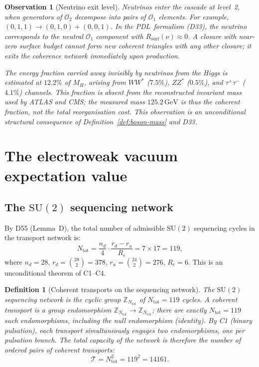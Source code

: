 \documentclass[12pt,a4paper]{article}
\newtheorem{definition}[theorem]{Definition}
\newtheorem{observation}[theorem]{Observation}
\theoremstyle{remark}
\newcommand{\PDL}{\textsc{pdl}}
\newcommand{\Ntot}{N_{\mathrm{tot}}}
\newcommand{\GeV}{\,\mathrm{GeV}}
\def\PDL{PDL}%
\begin{document}
\begin{observation}[Neutrino exit level]\label{obs:neutrinos}
Neutrinos enter the cascade at level~2, when generators of $\mathcal{O}_{2}$
decompose into pairs of $\mathcal{O}_{1}$ elements. For example,
$(0,1,1)\to(0,1,0)+(0,0,1)$. In the \PDL\ formalism (D33), the neutrino
corresponds to the neutral $\mathcal{O}_{1}$ component with
$R_{\mathrm{surf}}(\nu)\approx0$. A closure with near-zero surface budget
cannot form new coherent triangles with any other closure; it exits the
coherence network immediately upon production.

The energy fraction carried away invisibly by neutrinos from the Higgs is
estimated at $12.2\%$ of $M_{H}$, arising from $WW^{*}$ ($7.5\%$), $ZZ^{*}$
($0.5\%$), and $\tau^{+}\tau^{-}$ ($4.1\%$) channels. This fraction is
absent from the reconstructed invariant mass used by ATLAS and CMS; the
measured mass $125.2\GeV$ is thus the \emph{coherent fraction}, not the total
reorganisation cost. This observation is an unconditional structural consequence
of Definition~\ref{def:boson-mass} and D33.
\end{observation}

\section{The electroweak vacuum expectation value}

\subsection{\texorpdfstring{The $\mathrm{SU}(2)$ sequencing network}{The SU(2) sequencing network}}

By D55 (Lemma~D), the total number of admissible $\mathrm{SU}(2)$ sequencing
cycles in the transport network is:
\begin{equation}
\Ntot = \frac{n_{d}}{4}\cdot\frac{r_{d}-r_{u}}{R_{e}} = 7\times17=119,
\end{equation}
where $n_{d}=28$, $r_{d}=\binom{28}{2}=378$, $r_{u}=\binom{24}{2}=276$,
$R_{e}=6$. This is an unconditional theorem of C1--C4.

\begin{definition}[Coherent transports on the sequencing network]\label{def:transport}
The $\mathrm{SU}(2)$ sequencing network is the cyclic group $\mathbb{Z}_{\Ntot}$
of $\Ntot=119$ cycles. A \emph{coherent transport} is a group endomorphism
$\mathbb{Z}_{\Ntot}\to\mathbb{Z}_{\Ntot}$; there are exactly $\Ntot=119$ such
endomorphisms, including the null endomorphism (identity). By C1 (binary
pulsation), each transport simultaneously engages \emph{two} endomorphisms,
one per pulsation branch. The total capacity of the network is therefore the
number of ordered pairs of coherent transports:
\begin{equation}
\mathcal{T} = \Ntot^{2} = 119^{2} = 14161.
\end{equation}
\end{definition}
\end{document}
